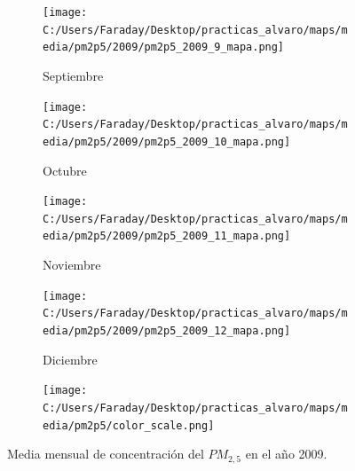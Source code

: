 \documentclass[12pt]{beamer}
\begin{document}
\begin{frame}[squeeze]
\begin{figure}[H]
\begin{subfigure}[H]{0.20\textwidth}
\texttt{[image: C:/Users/Faraday/Desktop/practicas\_alvaro/maps/media/pm2p5/2009/pm2p5\_2009\_9\_mapa.png]}
\captionsetup{labelformat=empty}
\caption{\scriptsize Septiembre}
\label{fig:map-pm2p5-2009-9}
\end{subfigure}
%
\begin{subfigure}[H]{0.20\textwidth}
\texttt{[image: C:/Users/Faraday/Desktop/practicas\_alvaro/maps/media/pm2p5/2009/pm2p5\_2009\_10\_mapa.png]}
\captionsetup{labelformat=empty}
\caption{\scriptsize Octubre}
\label{fig:map-pm2p5-2009-10}
\end{subfigure}
%
\begin{subfigure}[H]{0.20\textwidth}
\texttt{[image: C:/Users/Faraday/Desktop/practicas\_alvaro/maps/media/pm2p5/2009/pm2p5\_2009\_11\_mapa.png]}
\captionsetup{labelformat=empty}
\caption{\scriptsize Noviembre}
\label{fig:map-pm2p5-2009-11}
\end{subfigure}
%
\begin{subfigure}[H]{0.20\textwidth}
\texttt{[image: C:/Users/Faraday/Desktop/practicas\_alvaro/maps/media/pm2p5/2009/pm2p5\_2009\_12\_mapa.png]}
\captionsetup{labelformat=empty}
\caption{\scriptsize Diciembre}
\label{fig:map-pm2p5-2009-12}
\end{subfigure}

\begin{subfigure}[H]{0.45\textwidth}
\texttt{[image: C:/Users/Faraday/Desktop/practicas\_alvaro/maps/media/pm2p5/color\_scale.png]}
\captionsetup{labelformat=empty}
\caption{}
\end{subfigure}

\vspace*{-7mm}
\caption{\scriptsize Media mensual de concentración del $PM_{2,5}$ en el año 2009.}
\label{fig:map-pm2p5-2009}
\end{figure}
\end{frame}
\end{document}
